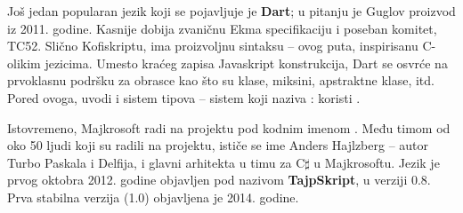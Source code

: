 Još jedan popularan jezik koji se pojavljuje je \textbf{Dart}; u pitanju je Guglov proizvod iz 2011. godine.
Kasnije dobija zvaničnu Ekma specifikaciju i poseban komitet, TC52.
Slično Kofiskriptu, ima proizvoljnu sintaksu -- ovog puta, inspirisanu C-olikim jezicima.
Umesto kraćeg zapisa Javaskript konstrukcija, Dart se osvrće na prvoklasnu podršku za obrasce kao što su klase, miksini, apstraktne klase, itd.
Pored ovoga, uvodi i sistem tipova -- sistem koji naziva : koristi . %

Istovremeno, Majkrosoft radi na projektu pod kodnim imenom .
Među timom od oko 50 ljudi koji su radili na projektu, ističe se ime Anders Hajlzberg -- autor Turbo Paskala i Delfija, i glavni arhitekta u timu za C$\sharp$ u Majkrosoftu.
Jezik je prvog oktobra 2012. godine objavljen pod nazivom \textbf{TajpSkript}, u verziji 0.8.
Prva stabilna verzija (1.0) objavljena je 2014. godine.

